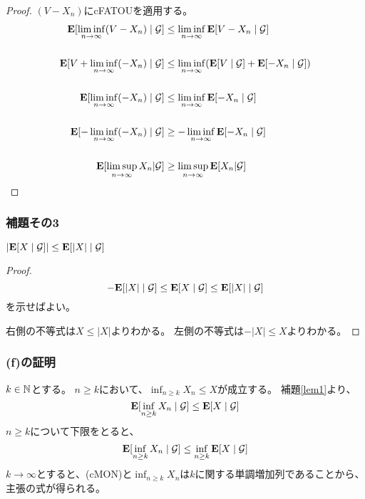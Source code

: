         \begin{proof}
          $(V - X_n)$にcFATOUを適用する。
          \begin{align*}
            {\mathbf{E}}[\liminf_{n \to \infty}(V - X_n) \mid \mathcal{G}] &\leq \liminf_{n \to \infty}{\mathbf{E}}[V - X_n \mid \mathcal{G}] \\
            \\
            {\mathbf{E}}[V + \liminf_{n \to \infty}(- X_n) \mid \mathcal{G}]
            &\leq
             \liminf_{n \to \infty}({\mathbf{E}}[V \mid \mathcal{G}] + {\mathbf{E}}[- X_n \mid \mathcal{G}]) \\
             \\
             {\mathbf{E}}[\liminf_{n \to \infty}(- X_n) \mid \mathcal{G}]
             &\leq
             \liminf_{n \to \infty} {\mathbf{E}}[- X_n \mid \mathcal{G}]\\
             \\
             {\mathbf{E}}[- \liminf_{n \to \infty}(- X_n) \mid \mathcal{G}]
             &\ge
             -\liminf_{n \to \infty} {\mathbf{E}}[- X_n \mid \mathcal{G}]\\
             \\
             {\mathbf{E}}[\limsup_{n \to \infty}X_n | \mathcal{G}]
             &\ge
             \limsup_{n \to \infty}{\mathbf{E}}[X_n | \mathcal{G}]\\
          \end{align*}
        \end{proof}

      \subsubsection{補題その3}
        \begin{lem}\label{lem3}
          $|{\mathbf{E}}[X \mid \mathcal{G}]| \leq {\mathbf{E}}[|X| \mid \mathcal{G}]$
        \end{lem}
        \begin{proof}
          \[
            -{\mathbf{E}}[|X| \mid \mathcal{G}] \leq {\mathbf{E}}[X \mid \mathcal{G}] \leq {\mathbf{E}}[|X| \mid \mathcal{G}]
          \]
          を示せばよい。

          右側の不等式は$X \leq |X|$よりわかる。
          左側の不等式は$-|X| \leq X$よりわかる。
        \end{proof}

      \subsubsection{(f)の証明}
        $k \in {\mathbb{N}}$とする。
        $n \ge k$において、$\inf_{n \ge k}X_n \leq X$が成立する。
        補題\ref{lem1}より、
        \[
          {\mathbf{E}}[\inf_{n \ge k}X_n \mid \mathcal{G}] \leq {\mathbf{E}}[X \mid \mathcal{G}]
        \]
        $n \ge k$について下限をとると、
        \[
          {\mathbf{E}}[\inf_{n \ge k}X_n \mid \mathcal{G}] \leq \inf_{n \ge k} {\mathbf{E}}[X \mid \mathcal{G}]
        \]
        $k \to \infty$とすると、(cMON)と$\inf_{n \ge k}X_n$は$k$に関する単調増加列であることから、
        主張の式が得られる。

